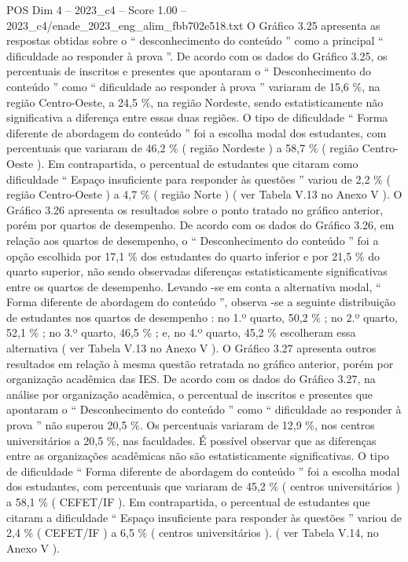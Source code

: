 \begin{textsample}{POS Dim 4 – 2023\_c4 – Score 1.00 – 2023\_c4/enade\_2023\_eng\_alim\_fbb702e518.txt}
O Gráfico 3.25 apresenta as respostas obtidas sobre o “ desconhecimento do conteúdo ” como a principal “ dificuldade ao responder à prova ”.
De acordo com os dados do Gráfico 3.25, os percentuais de inscritos e presentes que apontaram o “ Desconhecimento do conteúdo ” como “ dificuldade ao responder à prova ” variaram de 15,6 \%, na região Centro-Oeste, a 24,5 \%, na região Nordeste, sendo estatisticamente não significativa a diferença entre essas duas regiões.
O tipo de dificuldade “ Forma diferente de abordagem do conteúdo ” foi a escolha modal dos estudantes, com percentuais que variaram de 46,2 \% ( região Nordeste ) a 58,7 \% ( região Centro-Oeste ).
Em contrapartida, o percentual de estudantes que citaram como dificuldade “ Espaço insuficiente para responder às questões ” variou de 2,2 \% ( região Centro-Oeste ) a 4,7 \% ( região Norte ) ( ver Tabela V.13 no Anexo V ).
O Gráfico 3.26 apresenta os resultados sobre o ponto tratado no gráfico anterior, porém por quartos de desempenho.
De acordo com os dados do Gráfico 3.26, em relação aos quartos de desempenho, o “ Desconhecimento do conteúdo ” foi a opção escolhida por 17,1 \% dos estudantes do quarto inferior e por 21,5 \% do quarto superior, não sendo observadas diferenças estatisticamente significativas entre os quartos de desempenho.
Levando -se em conta a alternativa modal, “ Forma diferente de abordagem do conteúdo ”, observa -se a seguinte distribuição de estudantes nos quartos de desempenho : no 1.º quarto, 50,2 \% ; no 2.º quarto, 52,1 \% ; no 3.º quarto, 46,5 \% ; e, no 4.º quarto, 45,2 \% escolheram essa alternativa ( ver Tabela V.13 no Anexo V ).
O Gráfico 3.27 apresenta outros resultados em relação à mesma questão retratada no gráfico anterior, porém por organização acadêmica das IES.
De acordo com os dados do Gráfico 3.27, na análise por organização acadêmica, o percentual de inscritos e presentes que apontaram o “ Desconhecimento do conteúdo ” como “ dificuldade ao responder à prova ” não superou 20,5 \%.
Os percentuais variaram de 12,9 \%, nos centros universitários a 20,5 \%, nas faculdades.
É possível observar que as diferenças entre as organizações acadêmicas não são estatisticamente significativas.
O tipo de dificuldade “ Forma diferente de abordagem do conteúdo ” foi a escolha modal dos estudantes, com percentuais que variaram de 45,2 \% ( centros universitários ) a 58,1 \% ( CEFET/IF ).
Em contrapartida, o percentual de estudantes que citaram a dificuldade “ Espaço insuficiente para responder às questões ” variou de 2,4 \% ( CEFET/IF ) a 6,5 \% ( centros universitários ). ( ver Tabela V.14, no Anexo V ).

\end{textsample}
